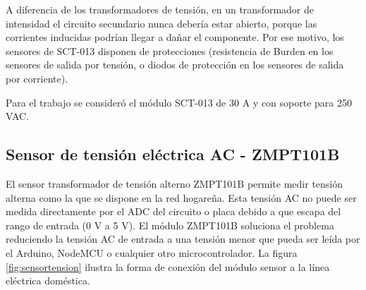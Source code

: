 







A diferencia de los transformadores de tensión, en un transformador de intensidad el circuito secundario nunca debería estar abierto, porque las corrientes inducidas podrían llegar a dañar el componente. Por ese motivo, los sensores de SCT-013 disponen de protecciones (resistencia de Burden en los sensores de salida por tensión, o diodos de protección en los sensores de salida por corriente)\citep{WEBSITE:9}.

Para el trabajo se consideró el módulo SCT-013 de 30 A y con soporte para 250 VAC.
\subsection{Sensor de tensión eléctrica AC - ZMPT101B}

El sensor transformador de tensión alterno ZMPT101B permite medir tensión alterna como la que se dispone en la red hogareña. Esta tensión AC no puede ser medida directamente por el ADC del circuito o placa debido a que escapa del rango de entrada (0 V a 5 V). El módulo ZMPT101B soluciona el problema reduciendo la tensión AC de entrada a una tensión menor que pueda ser leída por el Arduino, NodeMCU o cualquier otro microcontrolador. La figura \ref{fig:sensortension} ilustra la forma de conexión del módulo sensor a la línea eléctrica doméstica.

